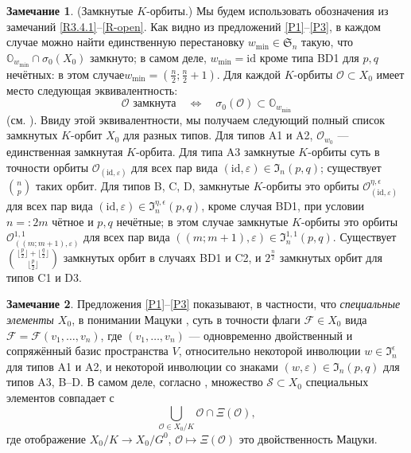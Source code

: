 \documentclass{amsart}
\theoremstyle{definition}
\newtheorem{remark}{Замечание}
\begin{document}
\begin{remark}
	
	(Замкнутые $K$-орбиты.)
\label{R-closed}
Мы будем использовать обозначения из замечаний \ref{R3.4.1}--\ref{R-open}.
Как видно из предложений \ref{P1}--\ref{P3}, в каждом случае можно найти единственную перестановку $w_{\mathrm{min}}\in\mathfrak{S}_n$ такую, что $\mathbb{O}_{w_{\mathrm{min}}}\cap\sigma_0(X_0)$ замкнуто;
в самом деле, $w_{\mathrm{min}}=\mathrm{id}$ кроме типа BD1 для $p,q$ нечётных:
в этом случае$w_{\mathrm{min}}=(\frac{n}{2};\frac{n}{2}+1)$.
Для каждой $K$-орбиты $\mathcal{O}\subset X_0$ имеет место следующая эквивалентность:
\[
\mbox{$\mathcal{O}$ замкнута}\quad \Leftrightarrow\quad \sigma_0(\mathcal{O})\subset\mathbb{O}_{w_{\mathrm{min}}}
\]
(см. \cite{Brion,Richardson-Springer}). Ввиду этой эквивалентности, мы получаем следующий полный список замкнутых $K$-орбит  $X_0$ для разных типов.
Для типов A1 и A2, $\mathcal{O}_{w_0}$ --- единственная замкнутая $K$-орбита.
Для типа A3 замкнутые $K$-орбиты суть в точности орбиты
$\mathcal{O}_{(\mathrm{id},\varepsilon)}$ для всех пар вида $(\mathrm{id},\varepsilon)\in\mathfrak{I}_n(p,q)$;
существует $\binom{n}{p}$ таких орбит.
Для типов B, C, D, замкнутые $K$-орбиты это орбиты
$\mathcal{O}^{\eta,\epsilon}_{(\mathrm{id},\varepsilon)}$ для всех пар вида $(\mathrm{id},\varepsilon)\in\mathfrak{I}^{\eta,\epsilon}_n(p,q)$,
кроме случая BD1, при условии $n=:2m$ чётное и $p,q$ нечётные;
в этом случае замкнутые $K$-орбиты
это орбиты $\mathcal{O}^{1,1}_{((m;m+1),\varepsilon)}$
для всех пар вида $((m;m+1),\varepsilon)\in\mathfrak{I}^{1,1}_n(p,q)$.
Существует $\binom{\lfloor\frac{p}{2}\rfloor+\lfloor\frac{q}{2}\rfloor}{\lfloor\frac{p}{2}\rfloor}$ замкнутых орбит в случаях BD1 и C2, и $2^{\frac{n}{2}}$ замкнутых орбит для типов C1 и D3.
\end{remark}


\begin{remark} Предложения
\ref{P1}--\ref{P3} показывают, в частности, что {\em специальные элементы $X_0$},  в понимании Мацуки \cite{Matsuki, Matsuki3}, суть в точности флаги $\mathcal{F}\in X_0$ вида
$\mathcal{F}=\mathcal{F}(v_1,\ldots,v_n)$, где $(v_1,\ldots,v_n)$ ---
одновременно двойственный и сопряжённый базис пространства $V$, относительно некоторой инволюции $w\in\mathfrak{I}_n^\epsilon$ для типов A1
и A2, и  некоторой инволюции со знаками
$(w,\varepsilon)\in\mathfrak{I}_n(p,q)$ для типов A3, B--D. В самом деле,  согласно \cite{Matsuki, Matsuki3}, множество
$\mathcal{S}\subset X_0$ специальных элементов совпадает с
\[\bigcup_{\mathcal{O}\in X_0/K}\mathcal{O}\cap\Xi(\mathcal{O}),\]
где отображение $X_0/K\to X_0/G^0$, $\mathcal{O}\mapsto\Xi(\mathcal{O})$
это двойственность Мацуки.
\end{remark}
\end{document}
